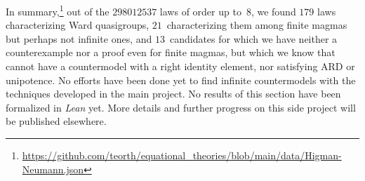 In summary,\footnote{\url{https://github.com/teorth/equational_theories/blob/main/data/Higman-Neumann.json}} out of the $\num{298012537}$ laws of order up to~$8$, we found $179$ laws characterizing Ward quasigroups, $21$~characterizing them among finite magmas but perhaps not infinite ones, and $13$~candidates for which we have neither a counterexample nor a proof even for finite magmas, but which we know that cannot have a countermodel with a right identity element, nor satisfying ARD or unipotence. No efforts have been done yet to find infinite countermodels with the techniques developed in the main project. No results of this section have been formalized in \emph{Lean} yet. More details and further progress on this side project will be published elsewhere.
